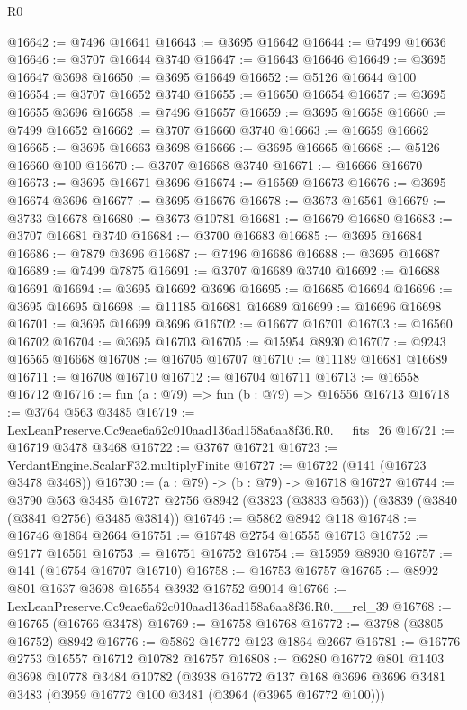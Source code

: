 \begin{lexlean}{R0}
\begin{coremodule}
@16642 := @7496 @16641
@16643 := @3695 @16642
@16644 := @7499 @16636
@16646 := @3707 @16644 @3740
@16647 := @16643 @16646
@16649 := @3695 @16647 @3698
@16650 := @3695 @16649
@16652 := @5126 @16644 @100
@16654 := @3707 @16652 @3740
@16655 := @16650 @16654
@16657 := @3695 @16655 @3696
@16658 := @7496 @16657
@16659 := @3695 @16658
@16660 := @7499 @16652
@16662 := @3707 @16660 @3740
@16663 := @16659 @16662
@16665 := @3695 @16663 @3698
@16666 := @3695 @16665
@16668 := @5126 @16660 @100
@16670 := @3707 @16668 @3740
@16671 := @16666 @16670
@16673 := @3695 @16671 @3696
@16674 := @16569 @16673
@16676 := @3695 @16674 @3696
@16677 := @3695 @16676
@16678 := @3673 @16561
@16679 := @3733 @16678
@16680 := @3673 @10781
@16681 := @16679 @16680
@16683 := @3707 @16681 @3740
@16684 := @3700 @16683
@16685 := @3695 @16684
@16686 := @7879 @3696
@16687 := @7496 @16686
@16688 := @3695 @16687
@16689 := @7499 @7875
@16691 := @3707 @16689 @3740
@16692 := @16688 @16691
@16694 := @3695 @16692 @3696
@16695 := @16685 @16694
@16696 := @3695 @16695
@16698 := @11185 @16681 @16689
@16699 := @16696 @16698
@16701 := @3695 @16699 @3696
@16702 := @16677 @16701
@16703 := @16560 @16702
@16704 := @3695 @16703
@16705 := @15954 @8930
@16707 := @9243 @16565 @16668
@16708 := @16705 @16707
@16710 := @11189 @16681 @16689
@16711 := @16708 @16710
@16712 := @16704 @16711
@16713 := @16558 @16712
@16716 := fun (a : @79) => fun (b : @79) => @16556 @16713
@16718 := @3764 @563 @3485
@16719 := LexLeanPreserve.Cc9eae6a62c010aad136ad158a6aa8f36.R0.__fits_26
@16721 := @16719 @3478 @3468
@16722 := @3767 @16721
@16723 := VerdantEngine.ScalarF32.multiplyFinite
@16727 := @16722 (@141 (@16723 @3478 @3468))
@16730 := (a : @79) -> (b : @79) -> @16718 @16727
@16744 := @3790
    @563
    @3485
    @16727
    @2756
    @8942
    (@3823 (@3833 @563))
    (@3839 (@3840 (@3841 @2756) @3485 @3814))
@16746 := @5862 @8942 @118
@16748 := @16746 @1864 @2664
@16751 := @16748 @2754 @16555 @16713
@16752 := @9177 @16561
@16753 := @16751 @16752
@16754 := @15959 @8930
@16757 := @141 (@16754 @16707 @16710)
@16758 := @16753 @16757
@16765 := @8992 @801 @1637 @3698 @16554 @3932 @16752 @9014
@16766 := LexLeanPreserve.Cc9eae6a62c010aad136ad158a6aa8f36.R0.__rel_39
@16768 := @16765 (@16766 @3478)
@16769 := @16758 @16768
@16772 := @3798 (@3805 @16752) @8942
@16776 := @5862 @16772 @123 @1864 @2667
@16781 := @16776 @2753 @16557 @16712 @10782 @16757
@16808 := @6280
    @16772
    @801
    @1403
    @3698
    @10778
    @3484
    @10782
    (@3938
      @16772
      @137
      @168
      @3696
      @3696
      @3481
      @3483
      (@3959 @16772 @100 @3481 (@3964 (@3965 @16772 @100)))

\end{coremodule}
\end{lexlean}
